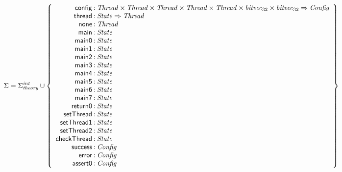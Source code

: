 \documentclass[a4paper]{article}
\def\lthtmlcheckvsize{\ifdim\ht\sizebox<\vsize 
  \ifdim\wd\sizebox<\hsize\expandafter\hfill\fi \expandafter\vfill
  \else\expandafter\vss\fi}%
\begin{document}
{\newpage\clearpage
{}%
$\displaystyle \Sigma = 
\Sigma^{\mathit{int}}_{\mathit{theory}}\cup\left\{
\begin{array}{r@{\>}c@{\>}l}
\mathsf{config} & : & \mathit{Thread} \times \mathit{Thread} \times \mathit{Thread} \times \mathit{Thread} \times \mathit{Thread} \times \mathit{bitvec}_{32} \times \mathit{bitvec}_{32} \Rightarrow \mathit{Config}\\
\mathsf{thread} & : & \mathit{State} \Rightarrow \mathit{Thread}\\
\mathsf{none} & : & \mathit{Thread}\\
\mathsf{main} & : & \mathit{State}\\
\mathsf{main0} & : & \mathit{State}\\
\mathsf{main1} & : & \mathit{State}\\
\mathsf{main2} & : & \mathit{State}\\
\mathsf{main3} & : & \mathit{State}\\
\mathsf{main4} & : & \mathit{State}\\
\mathsf{main5} & : & \mathit{State}\\
\mathsf{main6} & : & \mathit{State}\\
\mathsf{main7} & : & \mathit{State}\\
\mathsf{return0} & : & \mathit{State}\\
\mathsf{setThread} & : & \mathit{State}\\
\mathsf{setThread1} & : & \mathit{State}\\
\mathsf{setThread2} & : & \mathit{State}\\
\mathsf{checkThread} & : & \mathit{State}\\
\mathsf{success} & : & \mathit{Config}\\
\mathsf{error} & : & \mathit{Config}\\
\mathsf{assert0} & : & \mathit{Config}\\
\end{array}
\right\}
$%
\lthtmlindisplaymathZ
\lthtmlcheckvsize\clearpage}
\end{document}
